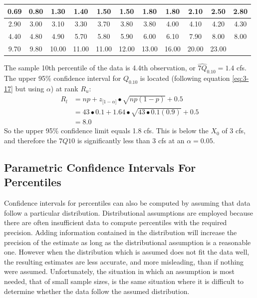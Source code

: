\documentclass[]{book}
\begin{document}
\begin{longtable}[]{@{}ccccccccccc@{}}
\toprule
0.69 & 0.80 & 1.30 & 1.40 & 1.50 & 1.50 & 1.80 & 1.80 & 2.10 & 2.50 & 2.80\tabularnewline
\midrule
\endhead
2.90 & 3.00 & 3.10 & 3.30 & 3.70 & 3.80 & 3.80 & 4.00 & 4.10 & 4.20 & 4.30\tabularnewline
4.40 & 4.80 & 4.90 & 5.70 & 5.80 & 5.90 & 6.00 & 6.10 & 7.90 & 8.00 & 8.00\tabularnewline
9.70 & 9.80 & 10.00 & 11.00 & 11.00 & 12.00 & 13.00 & 16.00 & 20.00 & 23.00 &\tabularnewline
\bottomrule
\end{longtable}

The sample 10th percentile of the data is 4.4th observation, or \(\hat{7Q}_{0.10} = 1.4\) cfs. The upper 95\% confidence interval for \(Q_{0.10}\) is located (following equation \eqref{eq:3-17} but using \(\alpha\)) at rank \(R_{u}\):
\begin{equation}
\begin{aligned}
R_{l} &= np + z_{\lbrack 1 - \alpha \rbrack} \bullet \sqrt{np(1 - p)} + 0.5\\
&= 43 \bullet 0.1 + 1.64 \bullet \sqrt{43 \bullet 0.1(0.9)} + 0.5 \\
&= 8.0
\end{aligned}
\end{equation}
So the upper 95\% confidence limit equals 1.8 cfs. This is below the \(X_{0}\) of 3 cfs, and therefore the \(7Q10\) is significantly less than 3 cfs at an \(\alpha = 0.05\).

\hypertarget{ch3-7-3}{%
\subsection{Parametric Confidence Intervals For Percentiles}\label{ch3-7-3}}

Confidence intervals for percentiles can also be computed by assuming that data follow a particular distribution. Distributional assumptions are employed because there are often insufficient data to compute percentiles with the required precision. Adding information contained in the distribution will increase the precision of the estimate as long as the distributional assumption is a reasonable one. However when the distribution which is assumed does not fit the data well, the resulting estimates are less accurate, and more misleading, than if nothing were assumed. Unfortunately, the situation in which an assumption is most needed, that of small sample sizes, is the same situation where it is difficult to determine whether the data follow the assumed distribution.
\end{document}
